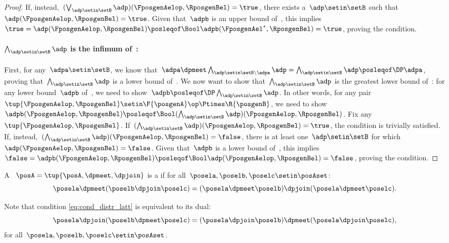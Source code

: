 \begin{proof}
    If, instead,~$(\bigvee_{\adp \setin \setB} \adp)(\FposgenAelop,\RposgenBel)=\true$, there exists a~$\adp\setin \setB$ such that~$\adp(\FposgenAelop,\RposgenBel)=\true$.
    Given that~$\adpb$ is an upper bound of~\setB, this implies~$\true=\adp(\FposgenAelop,\RposgenBel)\posleqof\Bool \adpb(\FposgenAel^*,\RposgenBel)=\true$, proving the condition.

    \paragraph*{$\bigwedge_{\adp \setin \setB} \adp$ is the infimum of~\setB:}
    First, for any~$\adpa\setin \setB$, we know that~$\adpa \dpmeet \bigwedge_{\adp \setin \setB \backslash \adpa} \adp= \bigwedge_{\adp \setin \setB} \adp \posleqof\DP \adpa$, proving that~$\bigwedge_{\adp \setin \setB} \adp$ is a lower bound of~\setB.
    We now want to show that~$\bigwedge_{\adp \setin \setB} \adp$ is the greatest lower bound of~\setB: for any lower bound~$\adpb$ of~\setB, we need to show~$\adpb\posleqof\DP\bigwedge_{\adp \setin \setB} \adp $.
    In other words, for any pair~$\tup{\FposgenAelop,\RposgenBel}\setin \F{\posgenA}\op\Ptimes \R{\posgenB}$, we need to show~$\adpb(\FposgenAelop,\RposgenBel) \posleqof\Bool (\bigwedge_{\adp \setin \setB} \adp)(\FposgenAelop,\RposgenBel)$.
    Fix any~$\tup{\FposgenAelop,\RposgenBel}$.
    If~$(\bigwedge_{\adp \setin \setB} \adp)(\FposgenAelop,\RposgenBel)=\true$, the condition is trivially satisfied.
    If, instead,~$(\bigwedge_{\adp \setin \setB} \adp)(\FposgenAelop,\RposgenBel)=\false$, there is at least one~$\adp\setin \setB$ for which~$\adp(\FposgenAelop,\RposgenBel)=\false$.
    Given that~$\adpb$ is a lower bound of~\setB, this implies~$\false=\adpb(\FposgenAelop,\RposgenBel)\posleqof\Bool \adp(\FposgenAelop,\RposgenBel)=\false$, proving the condition.
\end{proof}

\begin{definition}
    \label{def:distributive-lattice}
    A ~$\posA=\tup{\posA,{{\dpmeet}}, {{\dpjoin}}}$ is a  if for all~$\posela,\poselb,\poselc\setin \posAset$:
    \begin{equation}
        \label{eq:cond_distr_latt}
        \posela \dpmeet (\poselb \dpjoin \poselc)=(\posela \dpmeet \poselb)\dpjoin (\posela \dpmeet \poselc).
    \end{equation}
\end{definition}
\begin{remark}
    Note that condition \cref{eq:cond_distr_latt} is equivalent to its dual:
    \begin{equation}
        \posela \dpjoin (\poselb\dpmeet \poselc)=(\posela \dpjoin \poselb)\dpmeet (\posela\dpjoin \poselc),
    \end{equation}
    for all~$\posela,\poselb,\poselc\setin \posAset$.
\end{remark}

